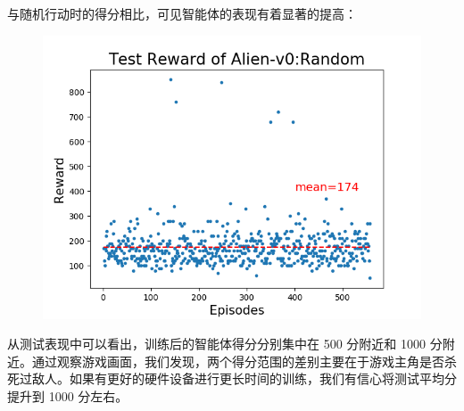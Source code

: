 \documentclass[UTF8]{ctexart}
\begin{document}
与随机行动时的得分相比，可见智能体的表现有着显著的提高：
\begin{figure}[H]
\centering
\includegraphics[scale=.8]{alien_random.png}
\end{figure}
从测试表现中可以看出，训练后的智能体得分分别集中在 500 分附近和 1000 分附近。通过观察游戏画面，我们发现，两个得分范围的差别主要在于游戏主角是否杀死过敌人。如果有更好的硬件设备进行更长时间的训练，我们有信心将测试平均分提升到 1000 分左右。
\end{document}

